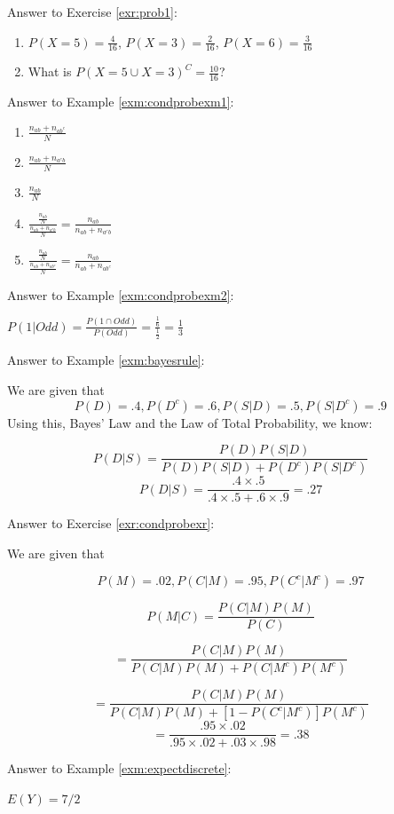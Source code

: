 \documentclass[
]{book}
\theoremstyle{definition}
\theoremstyle{definition}
\theoremstyle{definition}
\theoremstyle{remark}
\begin{document}
Answer to Exercise \ref{exr:prob1}:

\begin{enumerate}
\def\labelenumi{\arabic{enumi}.}
\item
  \(P(X = 5) = \frac{4}{16}\), \(P(X = 3) = \frac{2}{16}\), \(P(X = 6) = \frac{3}{16}\)
\item
  What is \(P(X=5 \cup X = 3)^C = \frac{10}{16}\)?
\end{enumerate}

Answer to Example \ref{exm:condprobexm1}:

\begin{enumerate}
\def\labelenumi{\arabic{enumi}.}
\item
  \(\frac{n_{ab} + n_{ab^c}}{N}\)
\item
  \(\frac{n_{ab} + n_{a^cb}}{N}\)
\item
  \(\frac{n_{ab}}{N}\)
\item
  \(\frac{\frac{n_{ab}}{N}}{\frac{n_{ab} + n_{a^cb}}{N}} = \frac{n_{ab}}{n_{ab} + n_{a^cb}}\)
\item
  \(\frac{\frac{n_{ab}}{N}}{\frac{n_{ab} + n_{ab^c}}{N}} = \frac{n_{ab}}{n_{ab} + n_{ab^c}}\)
\end{enumerate}

Answer to Example \ref{exm:condprobexm2}:

\(P(1|Odd) = \frac{P(1 \cap Odd)}{P(Odd)} = \frac{\frac{1}{6}}{\frac{1}{2}} = \frac{1}{3}\)

Answer to Example \ref{exm:bayesrule}:

We are given that
\[P(D) = .4, P(D^c) = .6, P(S|D) = .5, P(S|D^c) = .9\]
Using this, Bayes' Law and the Law of Total Probability, we know:

\[P(D|S) = \frac{P(D)P(S|D)}{P(D)P(S|D) + P(D^c)P(S|D^c)}\]
\[P(D|S) = \frac{.4 \times .5}{.4 \times .5 + .6 \times .9 } = .27\]

Answer to Exercise \ref{exr:condprobexr}:

We are given that

\[P(M) = .02, P(C|M) = .95, P(C^c|M^c) = .97\]

\[P(M|C) = \frac{P(C|M)P(M)}{P(C)}\]

\[= \frac{P(C|M)P(M)}{P(C|M)P(M) + P(C|M^c)P(M^c)}\]

\[= \frac{P(C|M)P(M)}{P(C|M)P(M) + [1-P(C^c|M^c)]P(M^c)}\]
\[ = \frac{.95 \times .02}{.95 \times .02 + .03 \times .98} = .38\]

Answer to Example \ref{exm:expectdiscrete}:

\(E(Y)=7/2\)
\end{document}

